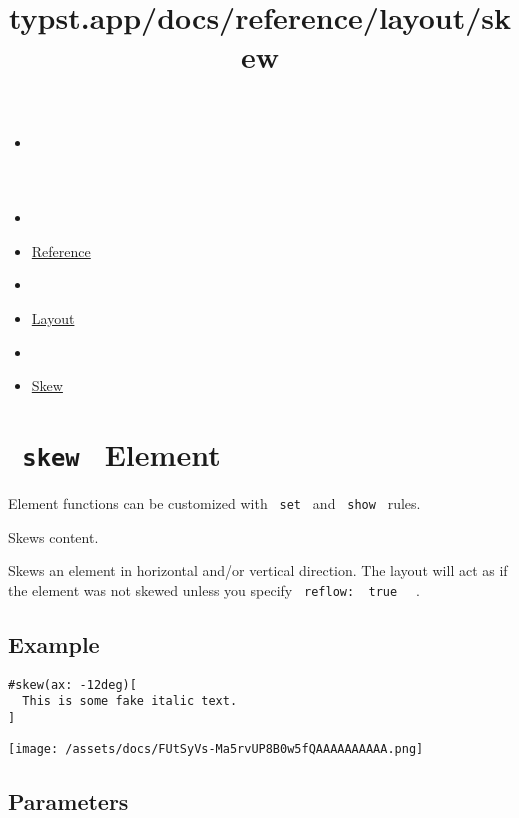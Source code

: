 \title{typst.app/docs/reference/layout/skew}

\begin{itemize}
\tightlist
\item
  \href{/docs}{}
\item
  
\item
  \href{/docs/reference/}{Reference}
\item
  
\item
  \href{/docs/reference/layout/}{Layout}
\item
  
\item
  \href{/docs/reference/layout/skew/}{Skew}
\end{itemize}

\section{\texorpdfstring{\texttt{\ skew\ } {{ Element
}}}{ skew   Element }}\label{summary}

\label{element-tooltip}
Element functions can be customized with \texttt{\ set\ } and
\texttt{\ show\ } rules.

Skews content.

Skews an element in horizontal and/or vertical direction. The layout
will act as if the element was not skewed unless you specify
\texttt{\ reflow:\ }{\texttt{\ true\ }}\texttt{\ } .

\subsection{Example}\label{example}

\begin{verbatim}
#skew(ax: -12deg)[
  This is some fake italic text.
]
\end{verbatim}

\texttt{[image: /assets/docs/FUtSyVs-Ma5rvUP8B0w5fQAAAAAAAAAA.png]}

\subsection{\texorpdfstring{{ Parameters
}}{ Parameters }}\label{parameters}

